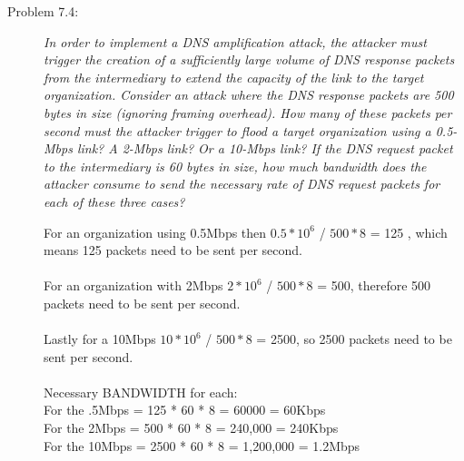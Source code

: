 \documentclass[12pt]{article}
\begin{document}
\begin{description}
\item[Problem 7.4:] {\color{grey}\textit{In order to implement a DNS amplification attack, the attacker must trigger the creation of a sufficiently large volume of DNS response packets from the intermediary to extend the capacity of the link to the target organization. Consider an attack where the DNS response packets are 500 bytes in size (ignoring framing overhead). How many of these packets per second must the attacker trigger to flood a target organization using a 0.5-Mbps link? A 2-Mbps link? Or a 10-Mbps link? If the DNS request packet to the intermediary is 60 bytes in size, how much bandwidth does the attacker consume to send the necessary rate of DNS request packets for each of these three cases?}} \par
 For an organization using 0.5Mbps then $0.5*10^6$ / $500*8$ = 125 , which means 125 packets need to be sent per second. \\\\For an organization with 2Mbps $2*10^6$ / $500*8$ = 500, therefore 500 packets need to be sent per second. \\\\ Lastly for a 10Mbps $10*10^6$ / $500*8$ = 2500, so 2500 packets need to be sent per second. \\ \\ Necessary BANDWIDTH for each: \\ For the .5Mbps = 125 * 60 * 8 = 60000 = 60Kbps \\ For the 2Mbps = 500 * 60 * 8 =  240,000 = 240Kbps \\ For the 10Mbps = 2500 * 60 * 8 = 1,200,000 = 1.2Mbps \par
\end{description}
\end{document}
